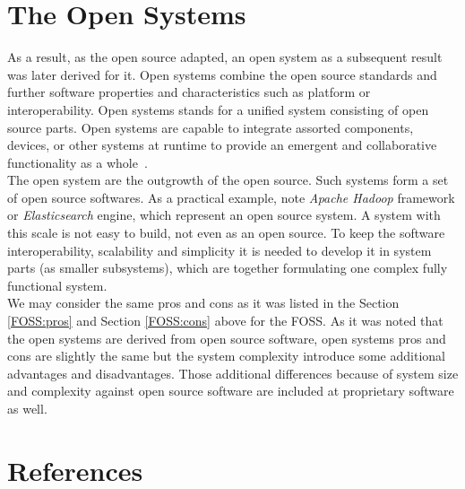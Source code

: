 \documentclass[12pt,a4paper]{article}
\theoremstyle{definition}
\begin{document}
\section{The Open Systems}

    As a result, as the open source adapted, an open system as a subsequent result was later derived for it. Open systems combine the open source standards and further software properties and characteristics such as platform or interoperability. Open systems stands for a unified system consisting of open source parts. Open systems are capable to integrate assorted components, devices, or other systems at runtime to provide an emergent and collaborative functionality as a whole~\cite{opensys1}.\\

    The open system are the outgrowth of the open source. Such systems form a set of open source softwares. As a practical example, note \textit{Apache Hadoop} framework or \textit{Elasticsearch} engine, which represent an open source system. A system with this scale is not easy to build, not even as an open source. To keep the software interoperability, scalability and simplicity it is needed to develop it in system parts (as smaller subsystems), which are together formulating one complex fully functional system.\\

    We may consider the same pros and cons as it was listed in the Section \ref{FOSS:pros} and Section \ref{FOSS:cons} above for the FOSS. As it was noted that the open systems are derived from open source software, open systems pros and cons are slightly the same but the system complexity introduce some additional advantages and disadvantages. Those additional differences because of system size and complexity against open source software are included at proprietary software as well.

\newpage

\section{References}

\begin{flushleft}
    
\end{flushleft}
\end{document}
